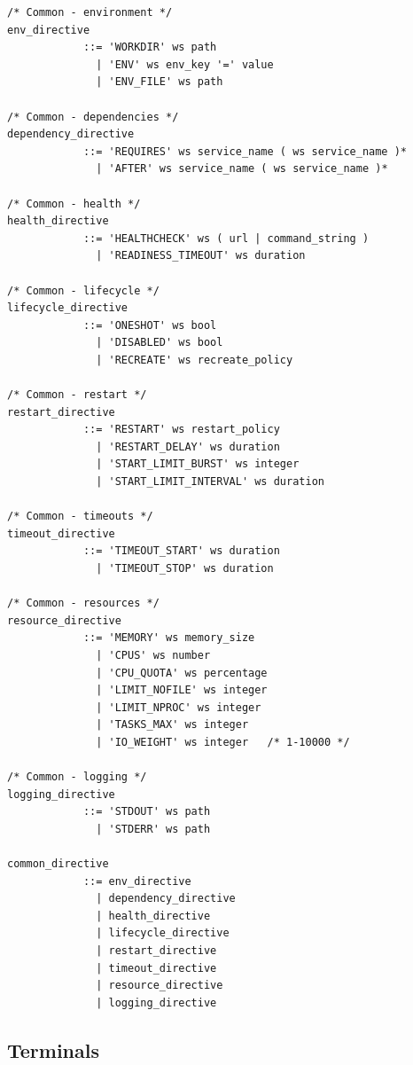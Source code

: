 \documentclass[a4paper,11pt]{article}
\begin{document}
\begin{lstlisting}
/* Common - environment */
env_directive
            ::= 'WORKDIR' ws path
              | 'ENV' ws env_key '=' value
              | 'ENV_FILE' ws path

/* Common - dependencies */
dependency_directive
            ::= 'REQUIRES' ws service_name ( ws service_name )*
              | 'AFTER' ws service_name ( ws service_name )*

/* Common - health */
health_directive
            ::= 'HEALTHCHECK' ws ( url | command_string )
              | 'READINESS_TIMEOUT' ws duration

/* Common - lifecycle */
lifecycle_directive
            ::= 'ONESHOT' ws bool
              | 'DISABLED' ws bool
              | 'RECREATE' ws recreate_policy

/* Common - restart */
restart_directive
            ::= 'RESTART' ws restart_policy
              | 'RESTART_DELAY' ws duration
              | 'START_LIMIT_BURST' ws integer
              | 'START_LIMIT_INTERVAL' ws duration

/* Common - timeouts */
timeout_directive
            ::= 'TIMEOUT_START' ws duration
              | 'TIMEOUT_STOP' ws duration

/* Common - resources */
resource_directive
            ::= 'MEMORY' ws memory_size
              | 'CPUS' ws number
              | 'CPU_QUOTA' ws percentage
              | 'LIMIT_NOFILE' ws integer
              | 'LIMIT_NPROC' ws integer
              | 'TASKS_MAX' ws integer
              | 'IO_WEIGHT' ws integer   /* 1-10000 */

/* Common - logging */
logging_directive
            ::= 'STDOUT' ws path
              | 'STDERR' ws path

common_directive
            ::= env_directive
              | dependency_directive
              | health_directive
              | lifecycle_directive
              | restart_directive
              | timeout_directive
              | resource_directive
              | logging_directive
\end{lstlisting}

\subsection{Terminals}
\end{document}
